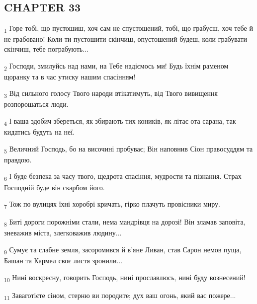 \subsection{CHAPTER 33}
\begin{tcolorbox}
\textsubscript{1} Горе тобі, що пустошиш, хоч сам не спустошений, тобі, що грабуєш, хоч тебе й не грабовано! Коли ти пустошити скінчиш, опустошений будеш, коли грабувати скінчиш, тебе пограбують...
\end{tcolorbox}
\begin{tcolorbox}
\textsubscript{2} Господи, змилуйсь над нами, на Тебе надіємось ми! Будь їхнім раменом щоранку та в час утиску нашим спасінням!
\end{tcolorbox}
\begin{tcolorbox}
\textsubscript{3} Від сильного голосу Твого народи втікатимуть, від Твого вивищення розпорошаться люди.
\end{tcolorbox}
\begin{tcolorbox}
\textsubscript{4} І ваша здобич збереться, як збирають тих коників, як літає ота сарана, так кидатись будуть на неї.
\end{tcolorbox}
\begin{tcolorbox}
\textsubscript{5} Величний Господь, бо на височині пробуває; Він наповнив Сіон правосуддям та правдою.
\end{tcolorbox}
\begin{tcolorbox}
\textsubscript{6} І буде безпека за часу твого, щедрота спасіння, мудрости та пізнання. Страх Господній буде він скарбом його.
\end{tcolorbox}
\begin{tcolorbox}
\textsubscript{7} Тож по вулицях їхні хоробрі кричать, гірко плачуть провісники миру.
\end{tcolorbox}
\begin{tcolorbox}
\textsubscript{8} Биті дороги порожніми стали, нема мандрівця на дорозі! Він зламав заповіта, зневажив міста, злегковажив людину...
\end{tcolorbox}
\begin{tcolorbox}
\textsubscript{9} Сумує та слабне земля, засоромився й в'яне Ливан, став Сарон немов пуща, Башан та Кармел своє листя зронили...
\end{tcolorbox}
\begin{tcolorbox}
\textsubscript{10} Нині воскресну, говорить Господь, нині прославлюсь, нині буду вознесений!
\end{tcolorbox}
\begin{tcolorbox}
\textsubscript{11} Заваготієте сіном, стерню ви породите; дух ваш огонь, який вас пожере...
\end{tcolorbox}
